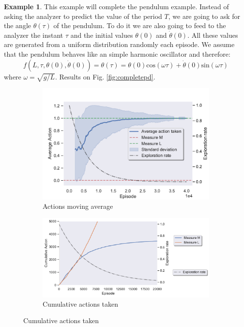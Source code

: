\documentclass[11pt,a4paper,twoside]{report}
\newcommand{\+}{\textnormal{+} }
\theoremstyle{definition}
\newtheorem{myex}[mythm]{Example}
\numberwithin{equation}{chapter}
\begin{document}
  \begin{myex}\label{pendulumcomplete}
    This example will complete the pendulum example. Instead of asking the 
    analyzer to predict the value of the period $T$, we are going to ask for 
    the angle $\theta(\tau)$ of the pendulum. To do it we are also going
    to feed to the analyzer the instant $\tau$ and the initial values
    $\theta(0)$ and $\dot\theta(0)$. All these values are generated from a
    uniform distribution randomly each episode. We assume that the pendulum
    behaves like an simple harmonic oscillator and therefore:
    \begin{equation}
      f(L,\tau, \theta(0),\dot\theta(0))=\theta(\tau)=
      \theta(0)\text{cos}(\omega\tau)+ \dot\theta(0)\text{sin}(\omega\tau)
    \end{equation}
    where $\omega = \sqrt{g/L}$. Results on Fig. \ref{fig:completepd}.

    \begin{figure}  %
      \begin{subfigure}{0.45\textwidth}
      \includegraphics[width=\linewidth]{figures/Action-MAB5.pdf}
      \caption{Actions moving average}
      \end{subfigure}
      \hfill %
      \begin{subfigure}{0.45\textwidth}
      \includegraphics[width=\linewidth]{figures/Cum-action-MAB5.pdf}
      \caption{Cumulative actions taken}
      \end{subfigure}
      

\end{figure}
\end{myex}
\end{document}
